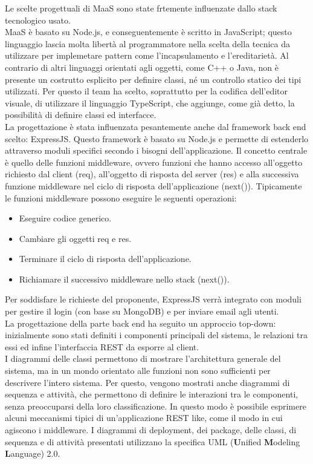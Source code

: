 \begin{itemize}
Le scelte progettuali di MaaS sono state frtemente influenzate dallo stack tecnologico usato. \\
MaaS è basato su Node.js, e conseguentemente è scritto in JavaScript; questo linguaggio lascia molta libertà al programmatore nella scelta della tecnica da utilizzare per implemetare pattern come l'incapsulamento e l'ereditarietà. Al contrario di altri linguaggi orientati agli oggetti, come C++ o Java, non è presente un costrutto esplicito per definire classi, né un controllo statico dei tipi utilizzati. Per questo il team ha scelto, soprattutto per la codifica dell'editor visuale, di utilizzare il linguaggio TypeScript, che aggiunge, come già detto, la possibilità di definire classi ed interfacce. \\
La progettazione è stata influenzata pesantemente anche dal framework back end scelto: ExpressJS. Questo framework è basato su Node.js e permette di estenderlo attraverso moduli specifici secondo i bisogni dell'applicazione. Il concetto centrale è quello delle funzioni middleware, ovvero funzioni che hanno accesso all'oggetto richiesto dal client (req), all'oggetto di risposta del server (res) e alla successiva funzione middleware nel ciclo di risposta dell'applicazione (next()). Tipicamente le funzioni middleware possono eseguire le seguenti operazioni:
\begin{itemize}
\item Eseguire codice generico.
\item Cambiare gli oggetti req e res.
\item Terminare il ciclo di risposta dell'applicazione.
\item Richiamare il successivo middleware nello stack (next()).
\end{itemize}
Per soddisfare le richieste del proponente, ExpressJS verrà integrato con moduli per gestire il login (con base su MongoDB) e per inviare email agli utenti. \\
La progettazione della parte back end ha seguito un approccio top-down: inizialmente sono stati definiti i componenti principali del sistema, le relazioni tra essi ed infine l'interfaccia REST da esporre al client. \\
I diagrammi delle classi permettono di mostrare l'architettura generale del sistema, ma in un mondo orientato alle funzioni non sono sufficienti per descrivere l'intero sistema. Per questo, vengono mostrati anche diagrammi di sequenza e attività, che permettono di definire le interazioni tra le componenti, senza preoccuparsi della loro classificazione. In questo modo è possibile esprimere alcuni meccanismi tipici di un'applicazione REST like, come il modo in cui agiscono i middleware. 
I diagrammi di deployment, dei package, delle classi, di sequenza e di attività presentati utilizzano la specifica UML (\textbf{U}nified \textbf{M}odeling \textbf{L}anguage) 2.0.

\end{itemize}
